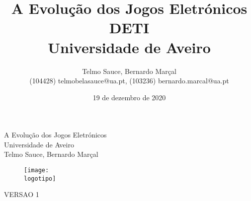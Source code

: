 \documentclass{report}
\begin{document}
%
\def\titulo{A Evolução dos Jogos Eletrónicos}
\def\data{19 de dezembro de 2020}
\def\autores{Telmo Sauce, Bernardo Marçal}
\def\autorescontactos{(104428) telmobelasauce@ua.pt, (103236) bernardo.marcal@ua.pt}
\def\versao{VERSAO 1}
\def\departamento{DETI}
\def\empresa{Universidade de Aveiro}
\def\logotipo{ua.pdf}
\def\jogomario{mario.jpg}
\def\jogopacman{PacMan.jpg}
\def\jogozelda{Zelda.jpg}
\def\jogofightingstreet{FightingStreet.jpg}
\def\jogotetris{Tetris.jpg}
\def\jogofreeway{Freeway.jpg}
\def\jogodonkeykong{DonkeyKong.jpg}
\def\jogofrogger{Frogger.JPG}
\def\gameboy{Gameboy.jpg}
\def\jogosupermario{Supermario.jpg}


%
%
\renewcommand{\contentsname}{Índice}
\begin{titlepage}

\begin{center}
%
\vspace*{50mm}
%
{\Huge \titulo}\\ 
%
\vspace{10mm}
%
{\Large \empresa}\\
%
\vspace{10mm}
%
{\LARGE \autores}\\ 
%
\vspace{30mm}
%
\begin{figure}[h]
\center
\texttt{[image: \\logotipo]}
\end{figure}
%
\vspace{30mm}
\end{center}
%
\begin{flushright}
\versao
\end{flushright}
\end{titlepage}

\title{%
{\Huge\textbf{\titulo}}\\
{\Large \departamento\\ \empresa}
}
%
\author{%
    \autores \\
    \autorescontactos
}
%
\date{\data}
%
\maketitle

\end{document}
